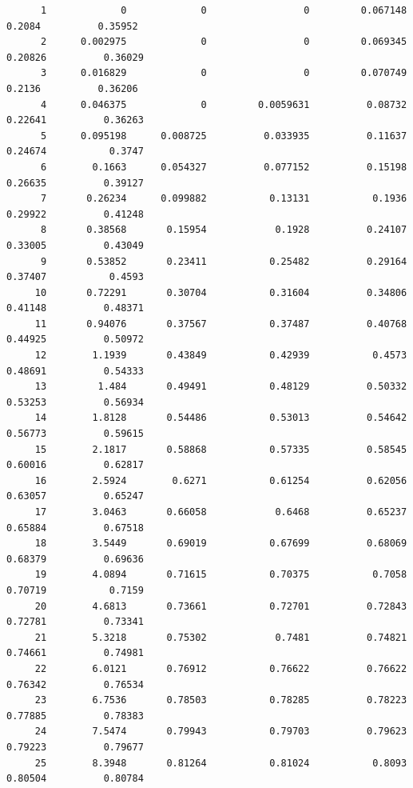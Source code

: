 \documentclass[
]{book}
\begin{document}
\begin{verbatim}
      1             0             0                 0         0.067148           0.2084          0.35952   
      2      0.002975             0                 0         0.069345          0.20826          0.36029   
      3      0.016829             0                 0         0.070749           0.2136          0.36206   
      4      0.046375             0         0.0059631          0.08732          0.22641          0.36263   
      5      0.095198      0.008725          0.033935          0.11637          0.24674           0.3747   
      6        0.1663      0.054327          0.077152          0.15198          0.26635          0.39127   
      7       0.26234      0.099882           0.13131           0.1936          0.29922          0.41248   
      8       0.38568       0.15954            0.1928          0.24107          0.33005          0.43049   
      9       0.53852       0.23411           0.25482          0.29164          0.37407           0.4593   
     10       0.72291       0.30704           0.31604          0.34806          0.41148          0.48371   
     11       0.94076       0.37567           0.37487          0.40768          0.44925          0.50972   
     12        1.1939       0.43849           0.42939           0.4573          0.48691          0.54333   
     13         1.484       0.49491           0.48129          0.50332          0.53253          0.56934   
     14        1.8128       0.54486           0.53013          0.54642          0.56773          0.59615   
     15        2.1817       0.58868           0.57335          0.58545          0.60016          0.62817   
     16        2.5924        0.6271           0.61254          0.62056          0.63057          0.65247   
     17        3.0463       0.66058            0.6468          0.65237          0.65884          0.67518   
     18        3.5449       0.69019           0.67699          0.68069          0.68379          0.69636   
     19        4.0894       0.71615           0.70375           0.7058          0.70719           0.7159   
     20        4.6813       0.73661           0.72701          0.72843          0.72781          0.73341   
     21        5.3218       0.75302            0.7481          0.74821          0.74661          0.74981   
     22        6.0121       0.76912           0.76622          0.76622          0.76342          0.76534   
     23        6.7536       0.78503           0.78285          0.78223          0.77885          0.78383   
     24        7.5474       0.79943           0.79703          0.79623          0.79223          0.79677   
     25        8.3948       0.81264           0.81024           0.8093          0.80504          0.80784   

\end{verbatim}
\end{document}
